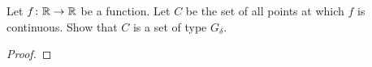 \begin{problem}
Let $f\colon\mathbb{R}\to\mathbb{R}$ be a function. Let $C$ be the set of all points
at which $f$ is continuous. Show that $C$ is a set of type $G_\delta$.
\end{problem}
\begin{proof}



\end{proof}

